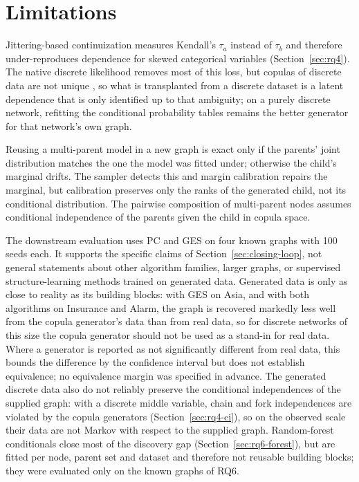 \documentclass[
  english,
  class=report,
  accentcolor=2c,
  marginpar=false,
  parskip=half-,
  fontsize=11pt,
  ruledheaders=false,
  pdfa=false,
  IMRAD=false,
  thesis={type=master}
]{tudapub}
\begin{document}
\section{Limitations}
Jittering-based continuization measures Kendall's $\tau_a$ instead of
$\tau_b$ and therefore under-reproduces dependence for skewed categorical
variables (Section~\ref{sec:rq4}). The native discrete likelihood removes
most of this loss, but copulas of discrete data are not unique
\parencite{genest2007}, so what is transplanted from a discrete dataset is
a latent dependence that is only identified up to that ambiguity; on a
purely discrete network, refitting the conditional probability tables
remains the better generator for that network's own graph.

Reusing a multi-parent model in a new graph is exact only if the parents'
joint distribution matches the one the model was fitted under; otherwise
the child's marginal drifts. The sampler detects this and margin
calibration repairs the marginal, but calibration preserves only the ranks
of the generated child, not its conditional distribution. The pairwise
composition of multi-parent nodes assumes conditional independence of the
parents given the child in copula space.

The downstream evaluation uses PC and GES on four known graphs with 100
seeds each. It supports the specific claims of
Section~\ref{sec:closing-loop}, not general statements about other
algorithm families, larger graphs, or supervised structure-learning
methods trained on generated data. Generated data is only as close to
reality as its building blocks: with GES on Asia, and with both algorithms
on Insurance and Alarm, the graph is recovered markedly less well from
the copula generator's data than from real data, so for discrete networks
of this size the copula generator should not be used as a stand-in for
real data. Where a generator is reported as not significantly different
from real data, this bounds the difference by the confidence interval but
does not establish equivalence; no equivalence margin was specified in
advance. The generated discrete data also do not reliably preserve the conditional independences of the supplied graph: with a discrete middle variable, chain and fork independences are violated by the copula generators (Section~\ref{sec:rq4-ci}), so on the observed scale their data are not Markov with respect to the supplied graph. Random-forest conditionals
close most of the discovery gap (Section~\ref{sec:rq6-forest}), but are fitted per
node, parent set and dataset and therefore not reusable building blocks;
they were evaluated only on the known graphs of RQ6.
\end{document}
